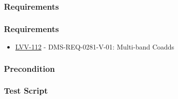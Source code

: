 \hypertarget{requirements-14}{%
\subsubsection{Requirements}\label{requirements-14}}

\hypertarget{requirements-15}{%
\subsubsection{Requirements}\label{requirements-15}}

\begin{itemize}
\tightlist
\item
  \href{https://jira.lsstcorp.org/browse/LVV-112}{LVV-112} -
  DMS-REQ-0281-V-01: Multi-band Coadds
\end{itemize}

\hypertarget{precondition-1}{%
\subsubsection{Precondition}\label{precondition-1}}

\hypertarget{test-script-7}{%
\subsubsection{Test Script}\label{test-script-7}}

